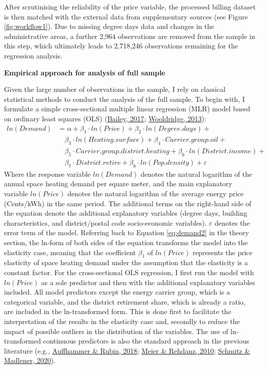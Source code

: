 \documentclass[12pt,twoside]{reedthesis}
\begin{document}
After scrutinising the reliability of the price variable, the processed billing dataset is then matched with the external data from supplementary sources (see Figure \ref{fig:workflow1}). Due to missing degree days data and changes in the administrative areas, a further 2,964 observations are removed from the sample in this step, which ultimately leads to 2,718,246 observations remaining for the regression analysis.

\textbf{Empirical approach for analysis of full sample}

Given the large number of observations in the sample, I rely on classical statistical methods to conduct the analysis of the full sample. To begin with, I formulate a simple cross-sectional multiple linear regression (MLR) model based on ordinary least squares (OLS) (\protect\hyperlink{ref-bailey17}{Bailey, 2017}; \protect\hyperlink{ref-wooldridge13}{Wooldridge, 2013}):
\begin{align*}
ln(Demand) & = \alpha + \beta_1 \cdot ln(Price) + \beta_2 \cdot ln(Degree.days) + \\
 & \quad \beta_3 \cdot ln(Heating.surface) + \beta_{4} \cdot Carrier.group.oil + \\
 & \quad \beta_{5} \cdot Carrier.group.district.heating + \beta_{6} \cdot ln(District.income) + \\
 & \quad \beta_{7} \cdot District.retire + \beta_{8} \cdot ln(Pop.density) + \varepsilon 
\end{align*}
Where the response variable \(ln(Demand)\) denotes the natural logarithm of the annual space heating demand per square meter, and the main explanatory variable \(ln(Price)\) denotes the natural logarithm of the average energy price (Cents/kWh) in the same period. The additional terms on the right-hand side of the equation denote the additional explanatory variables (degree days, building characteristics, and district/postal code socio-economic variables). \(\varepsilon\) denotes the error term of the model. Referring back to Equation \eqref{eq:demand2} in the theory section, the ln-form of both sides of the equation transforms the model into the elasticity case, meaning that the coefficient \(\beta_1\) of \(ln(Price)\) represents the price elasticity of space heating demand under the assumption that the elasticity is a constant factor. For the cross-sectional OLS regression, I first run the model with \(ln(Price)\) as a sole predictor and then with the additional explanatory variables included. All model predictors except the energy carrier group, which is a categorical variable, and the district retirement share, which is already a ratio, are included in the ln-transformed form. This is done first to facilitate the interpretation of the results in the elasticity case and, secondly to reduce the impact of possible outliers in the distribution of the variables. The use of ln-transformed continuous predictors is also the standard approach in the previous literature (e.g., \protect\hyperlink{ref-auffhammer_rubin18}{Auffhammer \& Rubin, 2018}; \protect\hyperlink{ref-meier_rehdanz10}{Meier \& Rehdanz, 2010}; \protect\hyperlink{ref-schmitz_madlener20}{Schmitz \& Madlener, 2020}).
\end{document}
